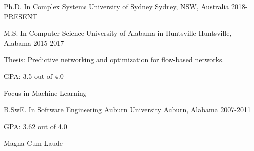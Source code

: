 

\begin{cventries}

  \cventry
    {Ph.D. In Complex Systems} %
    {University of Sydney} %
    {Sydney, NSW, Australia} %
    {2018-PRESENT} %
    {
    }

  \cventry
    {M.S. In Computer Science} %
    {University of Alabama in Huntsville} %
    {Huntsville, Alabama} %
    {2015-2017} %
    {
      \begin{cvitems} %
\item Thesis: Predictive networking and optimization for flow-based networks.
\item GPA: 3.5 out of 4.0
\item Focus in Machine Learning
      \end{cvitems}
    }

  \cventry
    {B.SwE. In Software Engineering} %
    {Auburn University} %
    {Auburn, Alabama} %
    {2007-2011} %
    {
      \begin{cvitems} %
\item GPA: 3.62 out of 4.0
\item Magna Cum Laude
      \end{cvitems}
    }

\end{cventries}
